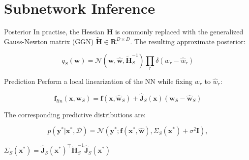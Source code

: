 \documentclass{beamer}
\begin{document}
\section{Subnetwork Inference}
\begin{frame}
\small
\begin{block}{Posterior}
In practise, the Hessian $\mathbf{H}$ is commonly replaced with the generalized Gauss-Newton matrix (GGN) $\tilde{\mathbf{H}} \in \mathbf{R}^{D \times D}$. The resulting approximate posterior:

\[q_S(\mathbf{w}) = \mathcal{N}(\mathbf{w}, \hat{\mathbf{w}}, \tilde{\mathbf{H}}_S^{-1})\prod_r \delta(w_r - \hat{w}_r)\]
\end{block}
\begin{block}{Prediction}
Perform a local linearization of the NN while fixing $w_r$ to $\hat{w}_r$:

\[\textbf{f}_{lin}(\mathbf{x}, \mathbf{w}_S) = \mathbf{f}(\mathbf{x}, \hat{\mathbf{w}}_S) + \hat{\mathbf{J}}_S(\mathbf{x})(\mathbf{w}_S - \hat{\mathbf{w}}_S)\]

The corresponding predictive distributions are:

\[p(\mathbf{y}^* | \mathbf{x}^*, \mathcal{D}) = \mathcal{N}(\mathbf{y}^*; \mathbf{f}(\mathbf{x}^*, \hat{\mathbf{w}}), \Sigma_S(\mathbf{x}^*) + \sigma^2\mathbf{I}),\]

\where $\Sigma_S(\mathbf{x}^*) = \hat{\mathbf{J}}_S(\mathbf{x}^*)^{\top}\tilde{\mathbf{H}}_S^{-1}\hat{\mathbf{J}}_S(\mathbf{x}^*)$
\end{block}
\end{frame}
\begin{frame}
\begin{figure}
  \centering
  \quad
  \quad
\end{figure}
\end{frame}
\end{document}
